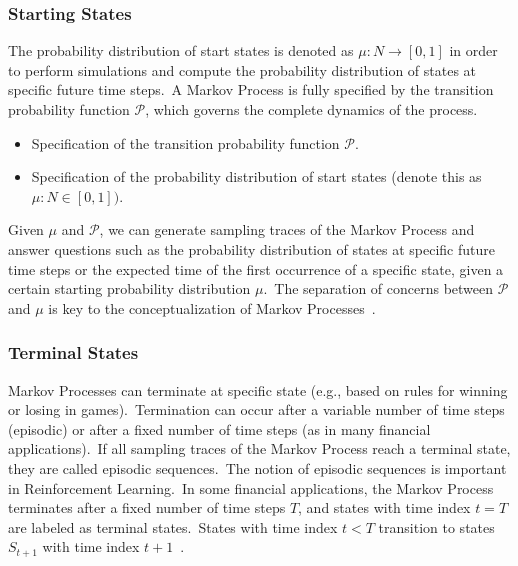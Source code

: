 \documentclass[../xlapes02]{subfiles}
\begin{document}
    \subsubsection{Starting States}
    The probability distribution of start states is denoted as $\mu : N \rightarrow [0,1]$ in order to perform simulations and compute the probability distribution of states at specific future time steps.\ A Markov Process is fully specified by the transition probability function $\mathcal{P}$, which governs the complete dynamics of the process.
    \begin{itemize}
        \item Specification of the transition probability function $\mathcal{P}$.
        \item Specification of the probability distribution of start states (denote this as $\mu : N \in[0, 1])$.
    \end{itemize}
    Given $\mu$ and $\mathcal{P}$, we can generate sampling traces of the Markov Process and answer questions such as the probability distribution of states at specific future time steps or the expected time of the first occurrence of a specific state, given a certain starting probability distribution $\mu$.\ The separation of concerns between $\mathcal{P}$ and $\mu$ is key to the conceptualization of Markov Processes~\cite{rao2022foundations}.

    \subsubsection{Terminal States}
    Markov Processes can terminate at specific state (e.g., based on rules for winning or losing in games).\ Termination can occur after a variable number of time steps (episodic) or after a fixed number of time steps (as in many financial applications).\ If all sampling traces of the Markov Process reach a terminal state, they are called episodic sequences.\ The notion of episodic sequences is important in Reinforcement Learning.\ In some financial applications, the Markov Process terminates after a fixed number of time steps $T$, and states with time index $t = T$ are labeled as terminal states.\ States with time index $t < T$ transition to states $S_{t+1}$ with time index $t + 1$~\cite{rao2022foundations}.
\end{document}

